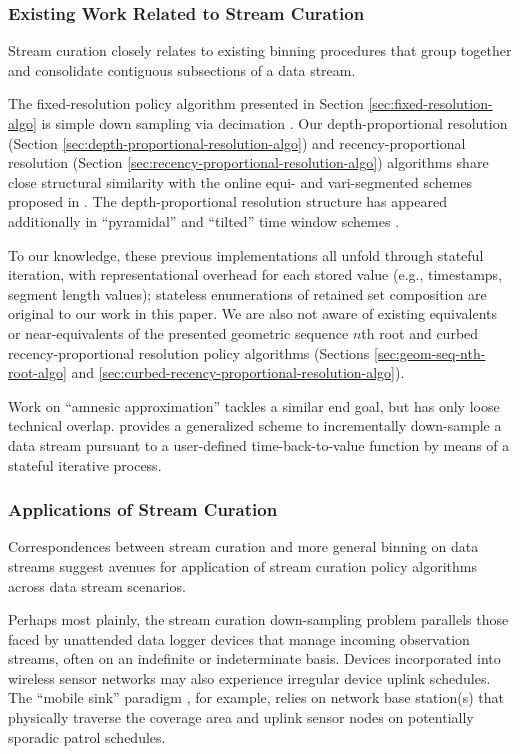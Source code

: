 \subsubsection{Existing Work Related to Stream Curation}

Stream curation closely relates to existing binning procedures that group together and consolidate contiguous subsections of a data stream.

The fixed-resolution policy algorithm presented in Section \ref{sec:fixed-resolution-algo} is simple down sampling via decimation \citep[p. 31]{crochiere1983multirate}.
Our depth-proportional resolution (Section \ref{sec:depth-proportional-resolution-algo}) and recency-proportional resolution (Section \ref{sec:recency-proportional-resolution-algo}) algorithms share close structural similarity with the online equi- and vari-segmented schemes proposed in
\citep{zhao2005generalized}.
The depth-proportional resolution structure has appeared additionally in ``pyramidal'' and ``tilted'' time window schemes \citep{aggarwal2003framework,han2005stream}.

To our knowledge, these previous implementations all unfold through stateful iteration, with representational overhead for each stored value (e.g., timestamps, segment length values); stateless enumerations of retained set composition are original to our work in this paper.
We are also not aware of existing equivalents or near-equivalents of the presented geometric sequence $n$th root and curbed recency-proportional resolution policy algorithms (Sections \ref{sec:geom-seq-nth-root-algo} and \ref{sec:curbed-recency-proportional-resolution-algo}).

Work on ``amnesic approximation'' tackles a similar end goal, but has only loose technical overlap.
\cite{palpanas2004online} provides a generalized scheme to incrementally down-sample a data stream pursuant to a user-defined time-back-to-value function by means of a stateful iterative process.

\subsubsection{Applications of Stream Curation}

Correspondences between stream curation and more general binning on data streams suggest avenues for application of stream curation policy algorithms across data stream scenarios.

Perhaps most plainly, the stream curation down-sampling problem parallels those faced by unattended data logger devices that manage incoming observation streams, often on an indefinite or indeterminate basis.
Devices incorporated into wireless sensor networks may also experience irregular device uplink schedules.
The ``mobile sink'' paradigm \citep{jain2022survey}, for example, relies on network base station(s) that physically traverse the coverage area and uplink sensor nodes on potentially sporadic patrol schedules.

